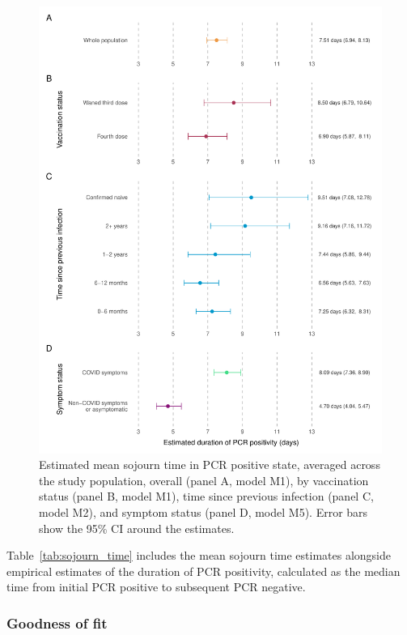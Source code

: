 \begin{figure}[htbp!]
    \centering
    \includegraphics[width=\textwidth]{sojourn_time.pdf}
    \caption[Estimated mean sojourn time in PCR positive state, averaged across the study population, by vaccination status, time since previous infection, and symptom status]{Estimated mean sojourn time in PCR positive state, averaged across the study population, overall (panel A, model M1), by vaccination status (panel B, model M1), time since previous infection (panel C, model M2), and symptom status (panel D, model M5). Error bars show the 95\% CI around the estimates.}\label{fig:sojourn-time}
\end{figure}

Table~\ref{tab:sojourn_time} includes the mean sojourn time estimates alongside empirical estimates of the duration of PCR positivity, calculated as the median time from initial PCR positive to subsequent PCR negative.

\subsubsection{Goodness of fit}

